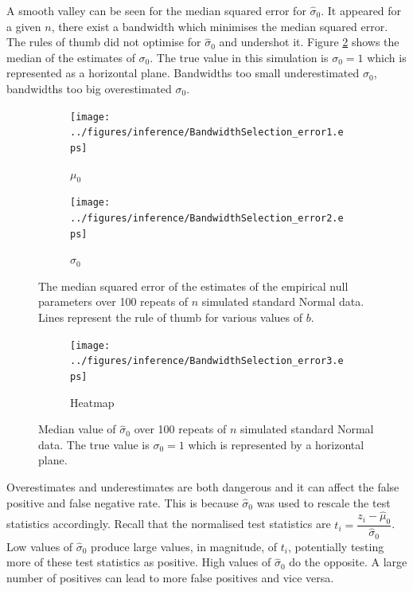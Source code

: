 A smooth valley can be seen for the median squared error for $\widehat{\sigma}_0$. It appeared for a given $n$, there exist a bandwidth which minimises the median squared error. The rules of thumb did not optimise for $\widehat{\sigma}_0$ and undershot it. Figure \ref{fig:inference_BandwidthSelection_error3} shows the median of the estimates of $\sigma_0$. The true value in this simulation is $\sigma_0=1$ which is represented as a horizontal plane. Bandwidths too small underestimated $\sigma_0$, bandwidths too big overestimated $\sigma_0$.

\begin{figure}
  \centering
  \begin{subfigure}[b]{\subSize}
      \texttt{[image: ../figures/inference/BandwidthSelection\_error1.eps]}
      \caption{$\mu_0$}
  \end{subfigure}
  \begin{subfigure}[b]{\subSize}
      \texttt{[image: ../figures/inference/BandwidthSelection\_error2.eps]}
      \caption{$\sigma_0$}
  \end{subfigure}
  \caption{The median squared error of the estimates of the empirical null parameters over 100 repeats of $n$ simulated standard Normal data. Lines represent the rule of thumb for various values of $b$.}
  \label{fig:inference_BandwidthSelection_error}
\end{figure}

\begin{figure}
  \centering
    \begin{subfigure}[b]{\subSize}
        \texttt{[image: ../figures/inference/BandwidthSelection\_error3.eps]}
        \caption{Heatmap}
    \end{subfigure}
    \caption{Median value of $\widehat{\sigma}_0$ over 100 repeats of $n$ simulated standard Normal data. The true value is $\sigma_0=1$ which is represented by a horizontal plane.}
    \label{fig:inference_BandwidthSelection_error3}
\end{figure}

Overestimates and underestimates are both dangerous and it can affect the false positive and false negative rate. This is because $\widehat{\sigma}_0$ was used to rescale the test statistics accordingly. Recall that the normalised test statistics are $t_i = \dfrac{z_i - \widehat{\mu}_0}{\widehat{\sigma}_0}$. Low values of $\widehat{\sigma}_0$ produce large values, in magnitude, of $t_i$, potentially testing more of these test statistics as positive. High values of $\widehat{\sigma}_0$ do the opposite. A large number of positives can lead to more false positives and vice versa.

